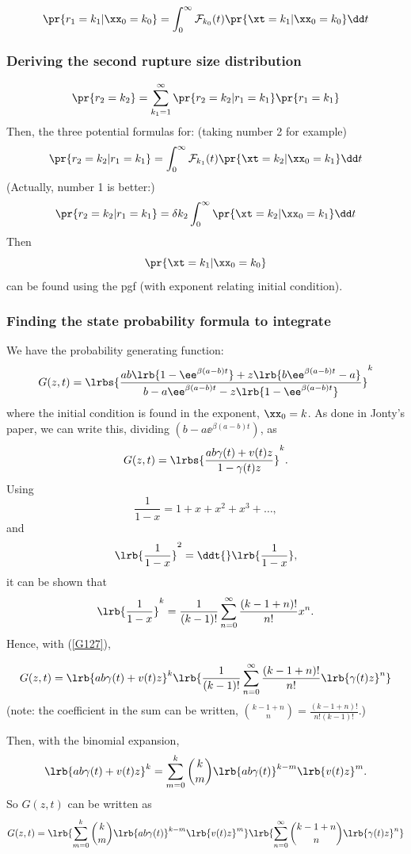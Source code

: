 $$\pr{r_1 = k_1| \xx_0 = k_0} = \int_0^{\infty}{\mathcal{F}_{k_0}(t)\pr{\xt = k_1| \xx_0 = k_0}}\dd t$$



\subsubsection{Deriving the second rupture size distribution}

$$\pr{r_2 = k_2} = \sum^{\infty}_{k_1 = 1} \pr{r_2 = k_2 | r_1 = k_1} \pr{r_1 = k_1}$$
Then, the three potential formulas for: (taking number 2 for example)
$$\pr{r_2 = k_2| r_1 = k_1} = \int_0^{\infty}{\mathcal{F}_{k_1}(t)\pr{\xt = k_2| \xx_0 = k_1}}\dd t$$
(Actually, number 1 is better:)
$$\pr{r_2 = k_2| r_1 = k_1}  = \delta k_2 \int_0^{\infty}\pr{\xt = k_2 | \xx_0 = {k_1}}\dd t$$
Then
$$\pr{\xt = k_1| \xx_0 = k_0}$$
can be found using the pgf (with exponent relating initial condition).\\

\subsubsection{Finding the state probability formula to integrate}
We have the probability generating function:
$$G(z,t) = \lrbs{\frac{ab\lrb{1 - \ee^{\beta (a-b) t}} + z\lrb{b\ee^{\beta(a-b) t} -a} }{ b-a\ee^{\beta(a-b)t} - z\lrb{1 - \ee^{\beta(a-b)t}}   }}^k$$
where the initial condition is found in the exponent, $\xx_0 = k$. As done in Jonty's paper, we can write this, dividing $(b-a\ee^{\beta(a-b) t})$, as
\begin{equation}
\label{G127}
G(z,t)  = \lrbs{\frac{ab\gamma(t) + v(t) z }{ 1- \gamma(t)z }}^k.
\end{equation}
Using 
$$\frac{1}{1-x} = 1+x+x^2+x^3+\dots,$$
and 
$$\lrb{\frac{1}{1-x}}^2 = \ddt{}\lrb{\frac{1}{1-x}},$$
it can be shown that 
$$\lrb{\frac{1}{1-x}}^k   = \frac{1}{(k-1)!} \sum^\infty_{n=0} \frac{(k-1+n)!}{n!} x^n.$$
Hence, with (\ref{G127}), 

$$G(z,t)  = \lrb{ab\gamma(t) + v(t) z }^k \lrb{ \frac{1}{(k-1)!} \sum^\infty_{n=0} \frac{(k-1+n)!}{n!} \lrb{\gamma(t) z}^n}$$
(note: the coefficient in the sum can be written, ${ k-1+n \choose n } = \frac{(k-1+n)!}{n! (k-1)!}$.)\par
Then, with the binomial expansion,
$$\lrb{ab\gamma(t) + v(t) z}^k =  \sum^{k}_{m=0} {k\choose m} \lrb{ab\gamma(t)}^{k-m} \lrb{v(t) z}^m.$$
So $G(z,t)$ can be written as 
$$G(z,t) =   \lrb{ \sum^{k}_{m=0} {k\choose m} \lrb{ab\gamma(t)}^{k-m} \lrb{v(t) z}^m   } \lrb{   \sum^\infty_{n=0} { k-1+n \choose n } \lrb{\gamma(t) z}^n}$$





